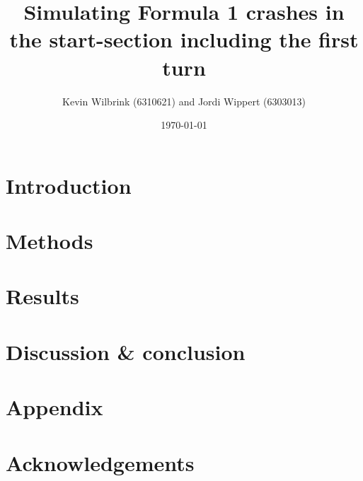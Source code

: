 \documentclass[12pt]{article}
\title{\textbf{Simulating Formula 1 crashes in the start-section including the first turn}}
\date{\today}
\author{Kevin Wilbrink (6310621) and Jordi Wippert (6303013)}
\begin{document}
	\maketitle

	\begin{multicols*}{2}
		\textbf{}

		\section{Introduction}
		

		\section{Methods}
		

		\section{Results}
		

    \section{Discussion \& conclusion}
		

		\section*{Appendix}
		

		\section*{Acknowledgements}
		

		
	\end{multicols*}
\end{document}
